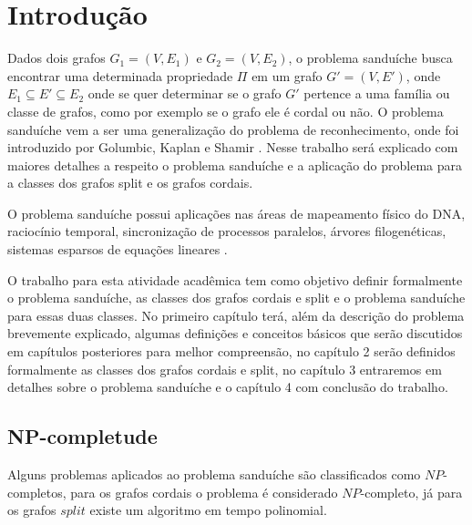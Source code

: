 \section{Introdução}

Dados dois grafos $G_1 = (V, E_1)$ e $G_2 = (V, E_2)$, o problema sanduíche busca encontrar uma determinada propriedade $\Pi$ em um grafo $G' = (V, E')$, onde $E_1 \subseteq E' \subseteq E_2$ onde se quer determinar se o grafo $G'$ pertence a uma família ou classe de grafos, como por exemplo se o grafo ele é cordal ou não. O problema sanduíche vem a ser uma generalização do problema de reconhecimento, onde foi introduzido por Golumbic, Kaplan e Shamir \cite{golumbic:95}. Nesse trabalho será explicado com maiores detalhes a respeito o problema sanduíche e a aplicação do problema para a classes dos grafos split e os grafos cordais.

O problema sanduíche possui aplicações nas áreas de mapeamento físico do DNA, raciocínio temporal, sincronização de processos paralelos, árvores filogenéticas, sistemas esparsos de equações lineares \cite{fernanda:2016}.

O trabalho para esta atividade acadêmica tem como objetivo definir formalmente o problema sanduíche, as classes dos grafos cordais e split e o problema sanduíche para essas duas classes. No primeiro capítulo terá, além da descrição do problema brevemente explicado, algumas definições e conceitos básicos que serão discutidos em capítulos posteriores para melhor compreensão, no capítulo 2 serão definidos formalmente as classes dos grafos cordais e split, no capítulo 3 entraremos em detalhes sobre o problema sanduíche e o capítulo 4 com conclusão do trabalho.


\subsection{NP-completude}

Alguns problemas aplicados ao problema sanduíche são classificados como $NP$-completos, para os grafos cordais o problema é considerado $NP$-completo, já para os grafos $split$ existe um algoritmo em tempo polinomial. 

